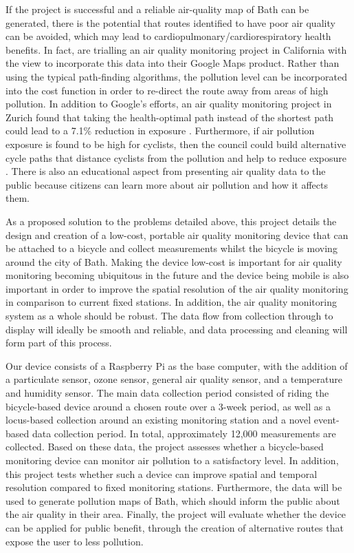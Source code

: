 \documentclass[11pt,twosided,a4paper]{report}
\begin{document}
If the project is successful and a reliable air-quality map of Bath can be generated, there is the potential that routes identified to have poor air quality can be avoided, which may lead to cardiopulmonary/cardiorespiratory health benefits. In fact, \cite{Google2017EnvReport} are trialling an air quality monitoring project in California with the view to incorporate this data into their Google Maps product. Rather than using the typical path-finding algorithms, the pollution level can be incorporated into the cost function in order to re-direct the route away from areas of high pollution. In addition to Google's efforts, an air quality monitoring project in Zurich found that taking the health-optimal path instead of the shortest path could lead to a 7.1\% reduction in exposure \citep{Hasenfratz2015highresmapsTram}. Furthermore, if air pollution exposure is found to be high for cyclists, then the council could build alternative cycle paths that distance cyclists from the pollution and help to reduce exposure \citep{schepers2015bikepaths}. There is also an educational aspect from presenting air quality data to the public because citizens can learn more about air pollution and how it affects them. 

As a proposed solution to the problems detailed above, this project details the design and creation of a low-cost, portable air quality monitoring device that can be attached to a bicycle and collect measurements whilst the bicycle is moving around the city of Bath. Making the device low-cost is important for air quality monitoring becoming ubiquitous in the future and the device being mobile is also important in order to improve the spatial resolution of the air quality monitoring in comparison to current fixed stations. In addition, the air quality monitoring system as a whole should be robust. The data flow from collection through to display will ideally be smooth and reliable, and data processing and cleaning will form part of this process. 

Our device consists of a Raspberry Pi as the base computer, with the addition of a particulate sensor, ozone sensor, general air quality sensor, and a temperature and humidity sensor. The main data collection period consisted of riding the bicycle-based device around a chosen route over a 3-week period, as well as a locus-based collection around an existing monitoring station and a novel event-based data collection period. In total, approximately 12,000 measurements are collected. Based on these data, the project assesses whether a bicycle-based monitoring device can monitor air pollution to a satisfactory level. In addition, this project tests whether such a device can improve spatial and temporal resolution compared to fixed monitoring stations. Furthermore, the data will be used to generate pollution maps of Bath, which should inform the public about the air quality in their area. Finally, the project will evaluate whether the device can be applied for public benefit, through the creation of alternative routes that expose the user to less pollution.
\end{document}
